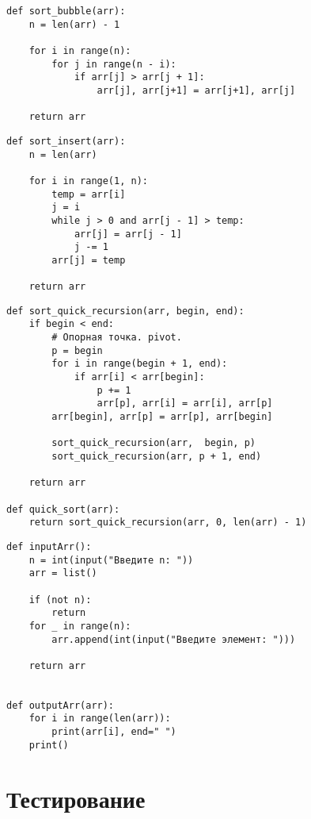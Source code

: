 \begin{lstlisting}[label=some-code,caption=Сортировка пузырьком]
	def sort_bubble(arr):
    n = len(arr) - 1

    for i in range(n):
        for j in range(n - i):
            if arr[j] > arr[j + 1]:
                arr[j], arr[j+1] = arr[j+1], arr[j] 

    return arr
\end{lstlisting}

\begin{lstlisting}[label=some-code,caption=Сортировка вставками]
def sort_insert(arr):
    n = len(arr)

    for i in range(1, n):
        temp = arr[i]
        j = i
        while j > 0 and arr[j - 1] > temp:
            arr[j] = arr[j - 1]
            j -= 1
        arr[j] = temp

    return arr
\end{lstlisting}

\begin{lstlisting}[label=some-code,caption=QuickSort]
def sort_quick_recursion(arr, begin, end):
    if begin < end:
        # Опорная точка. pivot.
        p = begin
        for i in range(begin + 1, end):
            if arr[i] < arr[begin]:
                p += 1
                arr[p], arr[i] = arr[i], arr[p]
        arr[begin], arr[p] = arr[p], arr[begin] 
        
        sort_quick_recursion(arr,  begin, p)
        sort_quick_recursion(arr, p + 1, end)

	return arr
	
def quick_sort(arr):
    return sort_quick_recursion(arr, 0, len(arr) - 1)
\end{lstlisting}


\begin{lstlisting}[label=some-code,caption=Методы для работы с массивом]
def inputArr():
    n = int(input("Введите n: "))
    arr = list()

    if (not n):
        return
    for _ in range(n):
        arr.append(int(input("Введите элемент: ")))

    return arr


def outputArr(arr):
    for i in range(len(arr)):
        print(arr[i], end=" ")
    print()
\end{lstlisting}


\section{Тестирование}


